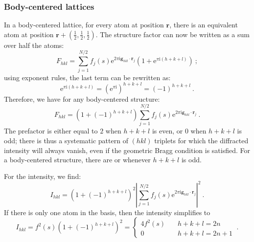 \subsubsection{Body-centered lattices}
In a body-centered lattice, for every atom at position $\mathbf{r}$, there is an equivalent atom at position $\mathbf{r}+(\frac{1}{2},\frac{1}{2},\frac{1}{2})$. The structure factor can now be written as a sum over half the atoms:
\[
	F_{hkl} = \sum_{j=1}^{N/2} f_j(s) \mathrm{e}^{2\pi\mathrm{i}\mathbf{g}_{hkl}\cdot\mathbf{r}_j}\left(1+ \mathrm{e}^{\pi\mathrm{i}(h+k+l)}\right)\ ;
\]
using exponent rules, the last term can be rewritten as:
\[
	\mathrm{e}^{\pi\mathrm{i}(h+k+l)} = \left(\mathrm{e}^{\pi\mathrm{i}}\right)^{h+k+l} = (-1)^{h+k+l}\ .
\]
Therefore, we have for any body-centered structure:
\begin{equation}
	F_{hkl} = \left(1+(-1)^{h+k+l}\right) \sum_{j=1}^{N/2} f_j(s) \mathrm{e}^{2\pi\mathrm{i}\mathbf{g}_{hkl}\cdot\mathbf{r}_j}\ .\label{\chabbr:eq:SFbodycentered}
\end{equation}
The prefactor is either equal to $2$ when $h+k+l$ is even, or $0$ when $h+k+l$ is odd; there is thus a systematic pattern of $(hkl)$ triplets for which the diffracted intensity will always vanish, even if the geometric Bragg condition is satisfied.  For a body-centered structure, there are  or  whenever $h+k+l$ is odd.  

\noindent For the intensity, we find:
\begin{equation}
	I_{hkl} = \left(1+(-1)^{h+k+l}\right)^2 \left\vert\sum_{j=1}^{N/2} f_j(s) \mathrm{e}^{2\pi\mathrm{i}\mathbf{g}_{hkl}\cdot\mathbf{r}_j}\right\vert^2\ .\label{\chabbr:eq:Ibodycentered}
\end{equation}
If there is only one atom in the basis, then the intensity simplifies to 
\[
	I_{hkl} = f^2(s) \left(1+(-1)^{h+k+l}\right)^2 = \left\{\begin{array}{lcl} 4f^2(s) &\, & h+k+l=2n\\ 0 & & h+k+l=2n+1\end{array}\right.\ .
\]


